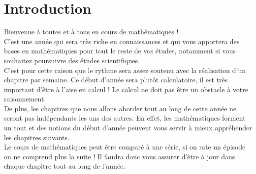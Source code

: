 \documentclass[12pt,fleqn]{report} %
\begin{document}
\pageDeGarde

\chapter*{Introduction}

Bienvenue à toutes et à tous en cours de mathématiques ! \\
C’est une année qui sera très riche en connaissances et qui vous apportera des bases en mathématiques pour tout le reste de vos études, notamment si vous souhaitez poursuivre des études scientifiques. \\
C’est pour cette raison que le rythme sera assez soutenu avec la réalisation d’un chapitre par semaine. Ce début d’année sera plutôt calculatoire, il est très important d’être à l’aise en calcul ! Le calcul ne doit pas être un obstacle à votre raisonnement.\\
De plus, les chapitres que nous allons aborder tout au long de cette année ne seront pas indépendants les uns des autres. En effet, les mathématiques forment un tout et des notions du début d’année peuvent vous servir à mieux appréhender les chapitres suivants.\\
Le cours de mathématiques peut être comparé à une série, si on rate un épisode on ne comprend plus la suite ! Il faudra donc vous assurer d’être à jour dans chaque chapitre tout au long de l'année. \\
\end{document}
